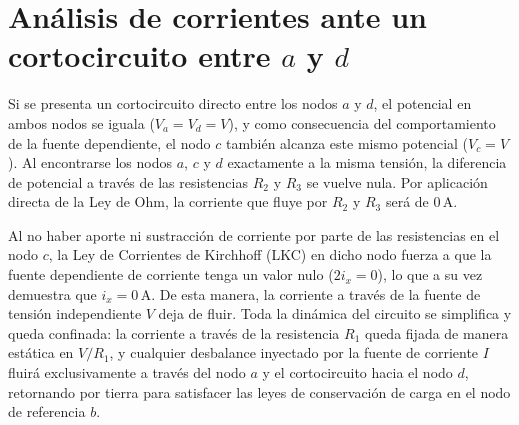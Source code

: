 \documentclass[12pt, a4paper]{article}
\begin{document}
\section*{Análisis de corrientes ante un cortocircuito entre $a$ y $d$}

Si se presenta un cortocircuito directo entre los nodos $a$ y $d$, el potencial en ambos nodos se iguala ($V_a = V_d = V$), y como consecuencia del comportamiento de la fuente dependiente, el nodo $c$ también alcanza este mismo potencial ($V_c = V$). Al encontrarse los nodos $a$, $c$ y $d$ exactamente a la misma tensión, la diferencia de potencial a través de las resistencias $R_2$ y $R_3$ se vuelve nula. Por aplicación directa de la Ley de Ohm, la corriente que fluye por $R_2$ y $R_3$ será de $0\,\text{A}$.

\vspace{0.3cm}

Al no haber aporte ni sustracción de corriente por parte de las resistencias en el nodo $c$, la Ley de Corrientes de Kirchhoff (LKC) en dicho nodo fuerza a que la fuente dependiente de corriente tenga un valor nulo ($2i_x = 0$), lo que a su vez demuestra que $i_x = 0\,\text{A}$. De esta manera, la corriente a través de la fuente de tensión independiente $V$ deja de fluir. Toda la dinámica del circuito se simplifica y queda confinada: la corriente a través de la resistencia $R_1$ queda fijada de manera estática en $V/R_1$, y cualquier desbalance inyectado por la fuente de corriente $I$ fluirá exclusivamente a través del nodo $a$ y el cortocircuito hacia el nodo $d$, retornando por tierra para satisfacer las leyes de conservación de carga en el nodo de referencia $b$.
\end{document}
